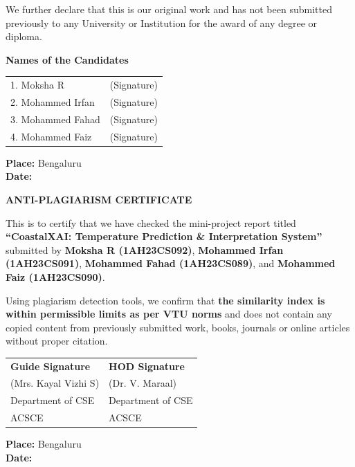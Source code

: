 \documentclass[12pt, a4paper]{article}
\begin{document}
\vspace{0.5cm}
\noindent
We further declare that this is our original work and has not been submitted previously to any University or Institution for the award of any degree or diploma.

\vspace{2cm}

\noindent
\textbf{Names of the Candidates}\\[0.3cm]
\begin{tabular}{l l}
1. Moksha R & (Signature)\\
2. Mohammed Irfan & (Signature)\\
3. Mohammed Fahad & (Signature)\\
4. Mohammed Faiz & (Signature)\\
\end{tabular}

\vspace{2cm}
\noindent
\textbf{Place:} Bengaluru\\
\textbf{Date:}
\newpage
\thispagestyle{empty}

\begin{center}
{\Large \textbf{ANTI-PLAGIARISM CERTIFICATE}}\\[1.5cm]
\end{center}

\noindent
This is to certify that we have checked the mini-project report titled  
\textbf{“CoastalXAI: Temperature Prediction \& Interpretation System”} submitted by  
\textbf{Moksha R (1AH23CS092)}, \textbf{Mohammed Irfan (1AH23CS091)},  
\textbf{Mohammed Fahad (1AH23CS089)}, and \textbf{Mohammed Faiz (1AH23CS090)}.

\vspace{0.5cm}
\noindent
Using plagiarism detection tools, we confirm that  
\textbf{the similarity index is within permissible limits as per VTU norms}  
and does not contain any copied content from previously submitted work, books, journals or online articles without proper citation.

\vspace{2cm}

\begin{tabular}{p{7cm} p{7cm}}
\textbf{Guide Signature} & \textbf{HOD Signature}\\[1cm]
(Mrs. Kayal Vizhi S) & (Dr. V. Maraal)\\
Department of CSE & Department of CSE\\
ACSCE & ACSCE\\
\end{tabular}

\vspace{2cm}
\noindent
\textbf{Place:} Bengaluru\\
\textbf{Date:}
\end{document}
